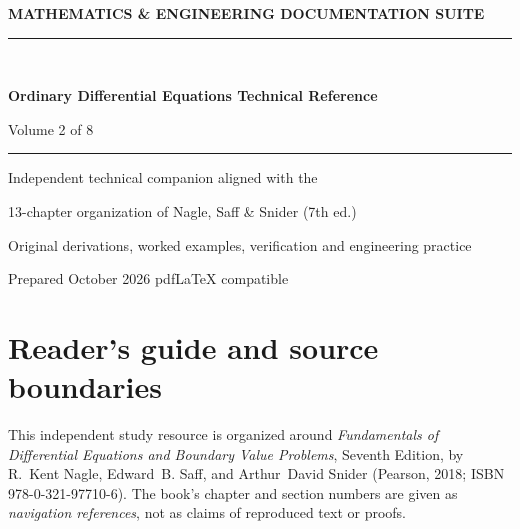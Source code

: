 \documentclass[11pt,letterpaper,oneside]{report}
\theoremstyle{definition}\newtheorem{definition}[theorem]{Definition}
\theoremstyle{remark}\newtheorem{remark}[theorem]{Remark}
\begin{document}
\hypersetup{pageanchor=false}%
\begin{titlepage}
\pagecolor{navy}\color{white}
\vspace*{0.75in}
{\sffamily\bfseries\large MATHEMATICS \& ENGINEERING DOCUMENTATION SUITE\\[12pt]}
{\color{cyan!40}\rule{\textwidth}{2pt}}\\[1.0in]
{\sffamily\bfseries\fontsize{29}{36}\selectfont Ordinary Differential Equations Technical Reference\par}
\vspace{0.45in}
{\Large Volume 2 of 8}\par\vspace{0.55in}
{\color{cyan!30}\rule{0.50\textwidth}{1pt}}\par\vspace{0.3in}
{\large Independent technical companion aligned with the\par}
{\large 13-chapter organization of Nagle, Saff \& Snider (7th ed.)\par}
\vfill
{\large Original derivations, worked examples, verification and engineering practice\par}\vspace{0.3in}
{\small Prepared October 2026 \quad\textbullet\quad pdf\LaTeX{} compatible\par}
\end{titlepage}\hypersetup{pageanchor=true}
\nopagecolor\color{ink}
\chapter*{Reader's guide and source boundaries}
This independent study resource is organized around \emph{Fundamentals of Differential Equations and Boundary Value Problems}, Seventh Edition, by R.~Kent Nagle, Edward~B. Saff, and Arthur~David Snider (Pearson, 2018; ISBN 978-0-321-97710-6). The book's chapter and section numbers are given as \emph{navigation references}, not as claims of reproduced text or proofs.
\end{document}
